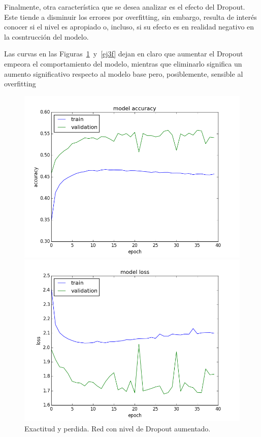 \documentclass{article}[12pt, a4paper]
\begin{document}
\newpage
Finalmente, otra característica que se desea analizar es el efecto del Dropout.
Este tiende a disminuir los errores por overfitting, sin embargo, resulta de interés
conocer si el nivel es apropiado o, incluso, si su efecto es en realidad negativo
en la cosntrucci\'on del modelo.

Las curvas en las Figuras~\ref{ej3e}~y~\ref{ej3f} dejan en claro que aumentar
el Dropout empeora el comportamiento del modelo, mientras que eliminarlo
significa un aumento significativo respecto al modelo base pero, posiblemente,
sensible al overfitting

\begin{figure}[b]
	\begin{minipage}[h]{0.49\textwidth}
		\includegraphics[width=\textwidth]{ej3eacc}
	\end{minipage}
	\begin{minipage}[h]{0.49\textwidth}
		\includegraphics[width=\textwidth]{ej3eloss}
	\end{minipage}
	\caption{Exactitud y perdida. Red con nivel de Dropout aumentado.}
	\label{ej3e}
\end{figure}
\end{document}
